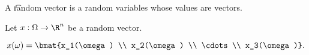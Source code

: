 


A \t{random vector} is a random variables whose values are vectors.


Let $x: \Omega \to \R^n$ be a random vector.

\[
  x(\omega) = \bmat{x_1(\omega) \\ x_2(\omega) \\ \cdots \\ x_3(\omega)}.
\]

\blankpage
